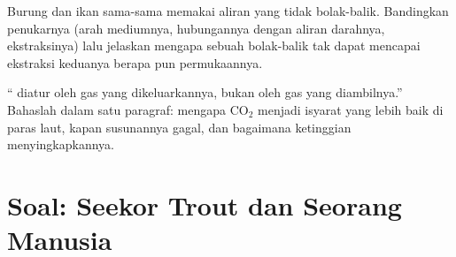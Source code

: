 \begin{exercise}[$\star\star\star$]\label{exo:b1:gas-exchange:11}
Burung dan ikan sama-sama memakai aliran yang tidak bolak-balik.
Bandingkan penukarnya (arah mediumnya, hubungannya dengan aliran
darahnya, ekstraksinya) lalu jelaskan mengapa sebuah 
bolak-balik tak dapat mencapai ekstraksi keduanya berapa pun
permukaannya.
\end{exercise}

\begin{exercise}[$\star\star\star$]\label{exo:b1:gas-exchange:12}
`` diatur oleh gas yang dikeluarkannya, bukan oleh gas yang
diambilnya.'' Bahaslah dalam satu paragraf: mengapa $\mathrm{CO_2}$
menjadi isyarat yang lebih baik di paras laut, kapan susunannya gagal,
dan bagaimana ketinggian menyingkapkannya.
\end{exercise}

\section{Soal: Seekor Trout dan Seorang Manusia}

